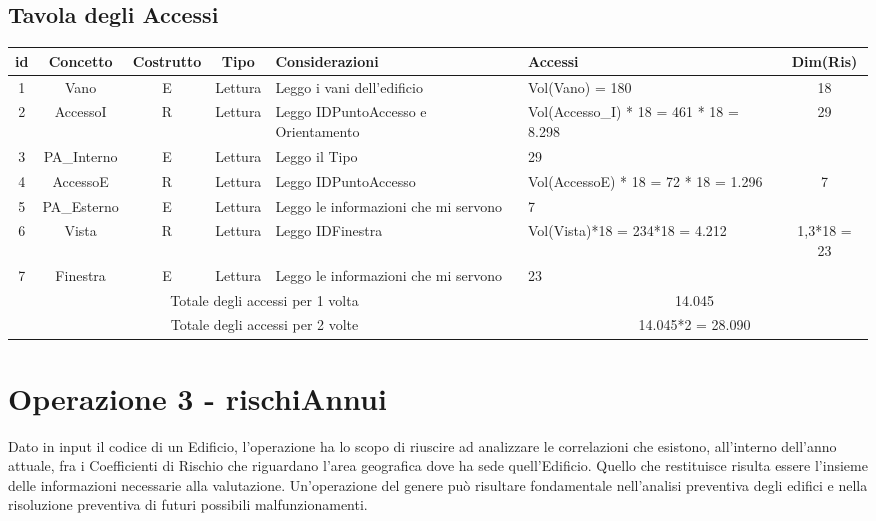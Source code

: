 \documentclass[12pt,a4paper]{report}
\begin{document}
        \subsection{Tavola degli Accessi}
        \begin{tabular}{|c|c|c|c|p{4cm}|p{3cm}|c|}
            \hline
            \textbf{id} & \textbf{Concetto} & \textbf{Costrutto} & \textbf{Tipo} & \textbf{Considerazioni} & \textbf{Accessi} & \textbf{Dim(Ris)} \\ \hline
            1 & Vano & E & Lettura & Leggo i vani dell'edificio & Vol(Vano) = 180 & 18 \\ \hline
            2 & AccessoI & R & Lettura & Leggo IDPuntoAccesso e Orientamento & Vol(Accesso\_I) * 18 = 461 * 18 = 8.298 & 29 \\ \hline
            3 & PA\_Interno & E & Lettura & Leggo il Tipo & 29 & ~ \\ \hline
            4 & AccessoE & R & Lettura & Leggo IDPuntoAccesso & Vol(AccessoE) * 18 = 72 * 18 = 1.296 & 7 \\ \hline
            5 & PA\_Esterno & E & Lettura & Leggo le informazioni che mi servono & 7 & ~ \\ \hline
            6 & Vista & R & Lettura & Leggo IDFinestra & Vol(Vista)*18 = 234*18 = 4.212 & 1,3*18 = 23 \\ \hline
            7 & Finestra & E & Lettura & Leggo le informazioni che mi servono & 23 & ~ \\ \hline
            \multicolumn{5}{|c|}{Totale degli accessi per 1 volta} & \multicolumn{2}{|c|}{14.045} \\ \hline
            \multicolumn{5}{|c|}{Totale degli accessi per 2 volte} & \multicolumn{2}{|c|}{14.045*2 = 28.090} \\ \hline
        \end{tabular}
        
        \newpage

        \section{Operazione 3 - rischiAnnui}
        Dato in input il codice di un Edificio, l'operazione ha lo scopo di riuscire ad analizzare le correlazioni che esistono, all'interno dell'anno attuale, fra i Coefficienti di Rischio che riguardano l'area geografica dove ha sede quell'Edificio. Quello che restituisce risulta essere l'insieme delle informazioni necessarie alla valutazione. Un'operazione del genere può risultare fondamentale nell'analisi preventiva degli edifici e nella risoluzione preventiva di futuri possibili malfunzionamenti.
        
\end{document}
